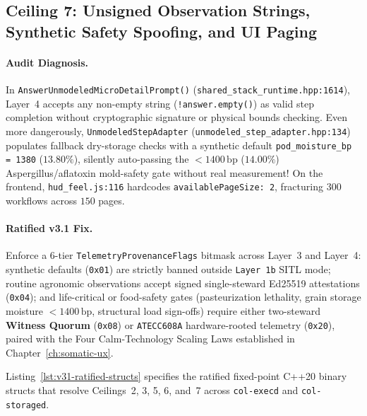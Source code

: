 \subsection{Ceiling 7: Unsigned Observation Strings, Synthetic Safety Spoofing, and UI Paging}

\paragraph{Audit Diagnosis.}
In \texttt{AnswerUnmodeledMicroDetailPrompt()} (\texttt{shared\_stack\_runtime.hpp:1614}), Layer~4 accepts any non-empty string (\texttt{!answer.empty()}) as valid step completion without cryptographic signature or physical bounds checking. Even more dangerously, \texttt{UnmodeledStepAdapter} (\texttt{unmodeled\_step\_adapter.hpp:134}) populates fallback dry-storage checks with a synthetic default \texttt{pod\_moisture\_bp = 1380} ($13.80\%$), silently auto-passing the $<1400\,\text{bp}$ ($14.00\%$) Aspergillus/aflatoxin mold-safety gate without real measurement! On the frontend, \texttt{hud\_feel.js:116} hardcodes \texttt{availablePageSize: 2}, fracturing $300$ workflows across $150$ pages.

\paragraph{Ratified v3.1 Fix.}
Enforce a 6-tier \texttt{TelemetryProvenanceFlags} bitmask across Layer~3 and Layer~4: synthetic defaults (\texttt{0x01}) are strictly banned outside \texttt{Layer 1b} SITL mode; routine agronomic observations accept signed single-steward Ed25519 attestations (\texttt{0x04}); and life-critical or food-safety gates (pasteurization lethality, grain storage moisture $<1400\,\text{bp}$, structural load sign-offs) require either two-steward \textbf{Witness Quorum} (\texttt{0x08}) or \texttt{ATECC608A} hardware-rooted telemetry (\texttt{0x20}), paired with the Four Calm-Technology Scaling Laws established in Chapter~\ref{ch:somatic-ux}.

Listing~\ref{lst:v31-ratified-structs} specifies the ratified fixed-point C++20 binary structs that resolve Ceilings~2, 3, 5, 6, and~7 across \texttt{col-execd} and \texttt{col-storaged}.

